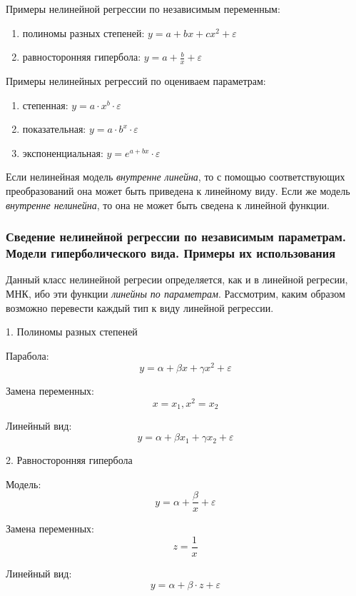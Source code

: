 \documentclass[aps,%
12pt,%
final,%
oneside,
onecolumn,%
musixtex, %
superscriptaddress,%
centertags]{article} %
\theoremstyle{plain}
\theoremstyle{definition}
\theoremstyle{remark}
\begin{document}
Примеры нелинейной регрессии по независимым переменным:
\begin{enumerate}
	\item полиномы разных степеней: $ y = a + bx + cx^2+ \varepsilon $
	\item равносторонняя гипербола: $ y = a + \frac{b}{x} + \varepsilon $
\end{enumerate}

Примеры нелинейных регрессий по оцениваем параметрам:
\begin{enumerate}
	\item степенная: $ y = a \cdot x^b \cdot \varepsilon $
	\item показательная: $ y = a \cdot b^x \cdot \varepsilon $
	\item экспоненциальная: $ y =e^{a+bx} \cdot \varepsilon $ 
\end{enumerate}

Если нелинейная модель \textit{внутренне линейна}, то с помощью соответствующих преобразований она может быть приведена к линейному виду. Если же модель \textit{внутренне нелинейна}, то она не может быть сведена к линейной функции.
\subsubsection{Сведение нелинейной регрессии по независимым параметрам. Модели гиперболического вида. Примеры их использования}

Данный класс нелинейной регресии определяется, как и в линейной регресии, МНК, ибо эти функции \textit{линейны по параметрам}. Рассмотрим, каким образом возможно перевести каждый тип к виду линейной регрессии.

\begin{center} 1. Полиномы разных степеней \end{center}

Парабола:
$$y = \alpha+ \beta x+\gamma x^2+\varepsilon$$

Замена переменных:
$$ x = x_1, x^2 = x_2 $$

Линейный вид:
$$ y = \alpha+ \beta x_1+\gamma x_2 +\varepsilon $$

\begin{center} 2. Равносторонняя гипербола \end{center}

Модель:
$$y = \alpha+\frac{\beta}{x}+\varepsilon$$

Замена переменных:
$$ z = \frac{1}{x} $$

Линейный вид:
$$y = \alpha+ \beta \cdot z+\varepsilon$$
\end{document}
